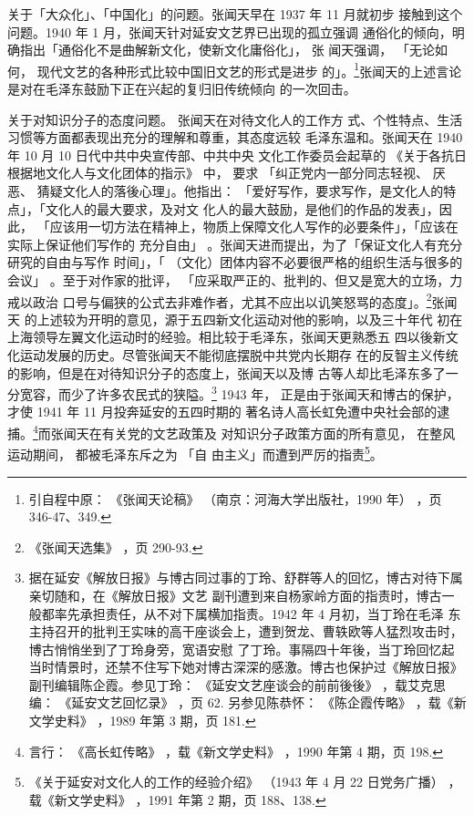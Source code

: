 关于「大众化」、「中国化」的问题。张闻天早在 1937 年 11 月就初步
接触到这个问题。1940 年 1 月，张闻天针对延安文艺界已出现的孤立强调
通俗化的倾向，明确指出「通俗化不是曲解新文化，使新文化庸俗化」，
张
闻天强调，
「无论如何，
现代文艺的各种形式比较中国旧文艺的形式是进步
的」。\footnote{引自程中原：
《张闻天论稿》
（南京：河海大学出版社，1990 年）
，页 346-47、349.}张闻天的上述言论是对在毛泽东鼓励下正在兴起的复归旧传统倾向
的一次回击。

关于对知识分子的态度问题。
张闻天在对待文化人的工作方
式、个性特点、生活习惯等方面都表现出充分的理解和尊重，其态度远较
毛泽东温和。张闻天在 1940 年 10 月 10 日代中共中央宣传部、中共中央
文化工作委员会起草的
《关于各抗日根据地文化人与文化团体的指示》
中， 要求
「纠正党内一部分同志轻视、 厌恶、
猜疑文化人的落後心理」。他指出：
「爱好写作，要求写作，是文化人的特点」，「文化人的最大要求，及对文
化人的最大鼓励，是他们的作品的发表」，因此，
「应该用一切方法在精神上，物质上保障文化人写作的必要条件」，「应该在实际上保证他们写作的
充分自由」 。张闻天进而提出，为了「保证文化人有充分研究的自由与写作
时间」，「 （文化）团体内容不必要很严格的组织生活与很多的会议」
。至于对作家的批评，
「应采取严正的、批判的、但又是宽大的立场，力戒以政治
口号与偏狭的公式去非难作者，尤其不应出以讥笑怒骂的态度」。\footnote{《张闻天选集》
，页 290-93.}张闻天
的上述较为开明的意见，源于五四新文化运动对他的影响，以及三十年代
初在上海领导左翼文化运动时的经验。相比较于毛泽东，张闻天更熟悉五
四以後新文化运动发展的历史。尽管张闻天不能彻底摆脱中共党内长期存
在的反智主义传统的影响，但是在对待知识分子的态度上，张闻天以及博
古等人却比毛泽东多了一分宽容，而少了许多农民式的狭隘。\footnote{据在延安《解放日报》与博古同过事的丁玲、舒群等人的回忆，博古对待下属亲切随和，在《解放日报》文艺
副刊遭到来自杨家岭方面的指责时，博古一般都率先承担责任，从不对下属横加指责。1942 年 4 月初，当丁玲在毛泽
东主持召开的批判王实味的高干座谈会上，遭到贺龙、曹轶欧等人猛烈攻击时，博古悄悄坐到了丁玲身旁，宽语安慰
了丁玲。事隔四十年後，当丁玲回忆起当时情景时，还禁不住写下她对博古深深的感激。博古也保护过《解放日报》
副刊编辑陈企霞。参见丁玲：
《延安文艺座谈会的前前後後》
，载艾克思编：
《延安文艺回忆录》
，页 62. 另参见陈恭怀：
《陈企霞传略》
，载《新文学史料》
，1989 年第 3 期，页 181. 
} 1943 年，
正是由于张闻天和博古的保护，才使 1941 年 11 月投奔延安的五四时期的
著名诗人高长虹免遭中央社会部的逮捕。\footnote{言行：
《高长虹传略》
，载《新文学史料》
，1990 年第 4 期，页 198.}而张闻天在有关党的文艺政策及
对知识分子政策方面的所有意见，
在整风运动期间，
都被毛泽东斥之为
「自
由主义」而遭到严厉的指责\footnote{《关于延安对文化人的工作的经验介绍》
（1943 年 4 月 22 日党务广播）
，载《新文学史料》
，1991 年第 2 期，页
188、138.}。

